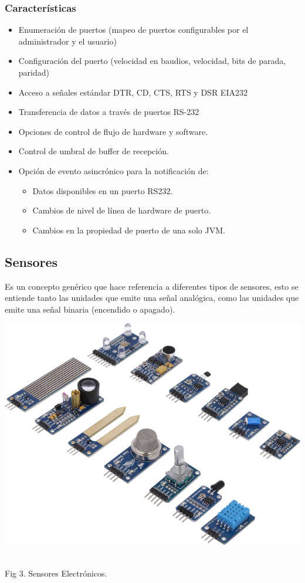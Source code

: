 \documentclass[letterpaper, 10 pt, conference]{ieeeconf}
\begin{document}
\subsubsection{Características}
 \begin{itemize}
     \item Enumeración de puertos (mapeo de puertos configurables por el administrador y el usuario)
     \item Configuración del puerto (velocidad en baudios, velocidad, bits de parada, paridad)
     \item Acceso a señales estándar DTR, CD, CTS, RTS y DSR EIA232
     \item Transferencia de datos a través de puertos RS-232
     \item Opciones de control de flujo de hardware y software.
     \item 	Control de umbral de buffer de recepción.
     \item Opción de evento asincrónico para la notificación de:
     \begin{itemize}
         \item Datos disponibles en un puerto RS232.
         \item Cambios de nivel de línea de hardware de puerto.
         \item Cambios en la propiedad de puerto de una solo JVM.
     \end{itemize}
 \end{itemize}

\subsection{Sensores}

Es un concepto genérico que hace referencia a diferentes tipos de sensores, esto se entiende tanto las unidades que emite una señal analógica, como las unidades que emite una señal binaria (encendido o apagado).

\begin{center}
\includegraphics[scale=0.25]{Documento/Figuras/fig4.jpg}
\begin{scriptsize}\\ 
Fig 3. Sensores Electrónicos.
\end{scriptsize}
\end{center}
\end{document}
